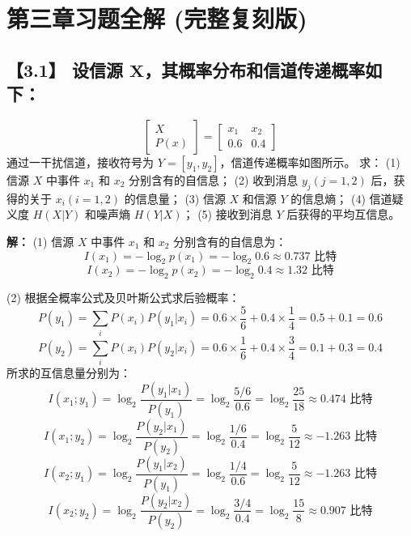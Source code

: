 \documentclass[11pt, a4paper]{article}
\begin{document}
\section{第三章习题全解 (完整复刻版)}

\subsection*{【3.1】 设信源 $\mathbf{X}$，其概率分布和信道传递概率如下：}
\[
\left[\begin{array}{c}X\\ P(x)\end{array}\right] = \left[\begin{array}{cc}x_1 & x_2 \\ 0.6 & 0.4\end{array}\right]
\]
通过一干扰信道，接收符号为 $Y=[y_1, y_2]$，信道传递概率如图所示。
求：
(1) 信源 $X$ 中事件 $x_1$ 和 $x_2$ 分别含有的自信息；
(2) 收到消息 $y_j(j=1,2)$ 后，获得的关于 $x_i(i=1,2)$ 的信息量；
(3) 信源 $X$ 和信源 $Y$ 的信息熵；
(4) 信道疑义度 $H(X|Y)$ 和噪声熵 $H(Y|X)$；
(5) 接收到消息 $Y$ 后获得的平均互信息。

\begin{center}
\end{center}

\textbf{解：}
(1) 信源 $X$ 中事件 $x_1$ 和 $x_2$ 分别含有的自信息为：
\[ I(x_1) = -\log_2 p(x_1) = -\log_2 0.6 \approx 0.737 \text{ 比特} \]
\[ I(x_2) = -\log_2 p(x_2) = -\log_2 0.4 \approx 1.32 \text{ 比特} \]

(2) 根据全概率公式及贝叶斯公式求后验概率：
\[ P(y_1) = \sum_i P(x_i)P(y_1|x_i) = 0.6 \times \frac{5}{6} + 0.4 \times \frac{1}{4} = 0.5 + 0.1 = 0.6 \]
\[ P(y_2) = \sum_i P(x_i)P(y_2|x_i) = 0.6 \times \frac{1}{6} + 0.4 \times \frac{3}{4} = 0.1 + 0.3 = 0.4 \]
所求的互信息量分别为：
\[ I(x_1; y_1) = \log_2 \frac{P(y_1|x_1)}{P(y_1)} = \log_2 \frac{5/6}{0.6} = \log_2 \frac{25}{18} \approx 0.474 \text{ 比特} \]
\[ I(x_1; y_2) = \log_2 \frac{P(y_2|x_1)}{P(y_2)} = \log_2 \frac{1/6}{0.4} = \log_2 \frac{5}{12} \approx -1.263 \text{ 比特} \]
\[ I(x_2; y_1) = \log_2 \frac{P(y_1|x_2)}{P(y_1)} = \log_2 \frac{1/4}{0.6} = \log_2 \frac{5}{12} \approx -1.263 \text{ 比特} \]
\[ I(x_2; y_2) = \log_2 \frac{P(y_2|x_2)}{P(y_2)} = \log_2 \frac{3/4}{0.4} = \log_2 \frac{15}{8} \approx 0.907 \text{ 比特} \]
\end{document}
